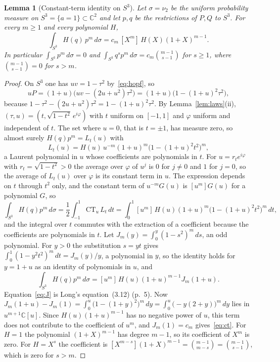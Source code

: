 \documentclass[11pt]{article}
\newtheorem{lemma}{Lemma}
\theoremstyle{remark}
\newcommand{\C}{\mathbb{C}}
\begin{document}
\begin{lemma}[Constant-term identity on $S^3$]\label{lem:ct}
Let $\sigma=\nu_2$ be the uniform probability measure on $S^3=\{a=1\}\subset\C^2$ and let $p,q$ be the restrictions of $P,Q$ to $S^3$. For every $m\ge1$ and every polynomial $H$,
\begin{equation}\label{eq:ct}
\int_{S^3}H(q)\,p^m\,d\sigma=c_m\,[X^m]\,H(X)(1+X)^{m-1}.
\end{equation}
In particular $\int_{S^3}p^m\,d\sigma=0$ and $\int_{S^3}q^sp^m\,d\sigma=c_m\binom{m-1}{s-1}$ for $s\ge1$, where $\binom{m-1}{s-1}=0$ for $s>m$.
\end{lemma}
\begin{proof}
On $S^3$ one has $uv=1-\tau^2$ by~\eqref{eq:hopf}, so
\begin{equation}\label{eq:up}
uP=(1+u)\big(uv-(2u+u^2)\tau^2\big)=(1+u)\big(1-(1+u)^2\tau^2\big),
\end{equation}
because $1-\tau^2-(2u+u^2)\tau^2=1-(1+u)^2\tau^2$. By Lemma~\ref{lem:laws}(ii), $(\tau,u)=(t,\sqrt{1-t^2}\,e^{i\varphi})$ with $t$ uniform on $[-1,1]$ and $\varphi$ uniform and independent of $t$. The set where $u=0$, that is $t=\pm1$, has measure zero, so almost surely $H(q)p^m=L_t(u)$ with
\[
L_t(u)=H(u)\,u^{-m}(1+u)^m\big(1-(1+u)^2t^2\big)^m,
\]
a Laurent polynomial in $u$ whose coefficients are polynomials in $t$. For $u=r_te^{i\varphi}$ with $r_t=\sqrt{1-t^2}>0$ the average over $\varphi$ of $u^j$ is $0$ for $j\ne0$ and $1$ for $j=0$, so the average of $L_t(u)$ over $\varphi$ is its constant term in $u$. The expression depends on $t$ through $t^2$ only, and the constant term of $u^{-m}G(u)$ is $[u^m]G(u)$ for a polynomial $G$, so
\[
\int_{S^3}H(q)p^m\,d\sigma=\frac12\int_{-1}^{1}\mathrm{CT}_u\,L_t\,dt=\int_0^1[u^m]\,H(u)(1+u)^m\big(1-(1+u)^2t^2\big)^m\,dt,
\]
and the integral over $t$ commutes with the extraction of a coefficient because the coefficients are polynomials in $t$. Let $J_m(y)=\int_0^y(1-s^2)^m\,ds$, an odd polynomial. For $y>0$ the substitution $s=yt$ gives $\int_0^1(1-y^2t^2)^m\,dt=J_m(y)/y$, a polynomial in $y$, so the identity holds for $y=1+u$ as an identity of polynomials in $u$, and
\begin{equation}\label{eq:J}
\int_{S^3}H(q)p^m\,d\sigma=[u^m]\,H(u)(1+u)^{m-1}J_m(1+u).
\end{equation}
Equation~\eqref{eq:J} is Long's equation~(3.12) (p.~5). Now $J_m(1+u)-J_m(1)=\int_0^u\big(1-(1+y)^2\big)^m\,dy=\int_0^u\big(-y(2+y)\big)^m\,dy$ lies in $u^{m+1}\C[u]$. Since $H(u)(1+u)^{m-1}$ has no negative power of $u$, this term does not contribute to the coefficient of $u^m$, and $J_m(1)=c_m$ gives~\eqref{eq:ct}. For $H=1$ the polynomial $(1+X)^{m-1}$ has degree $m-1$, so its coefficient of $X^m$ is zero. For $H=X^s$ the coefficient is $[X^{m-s}](1+X)^{m-1}=\binom{m-1}{m-s}=\binom{m-1}{s-1}$, which is zero for $s>m$. \qedhere
\end{proof}
\end{document}
